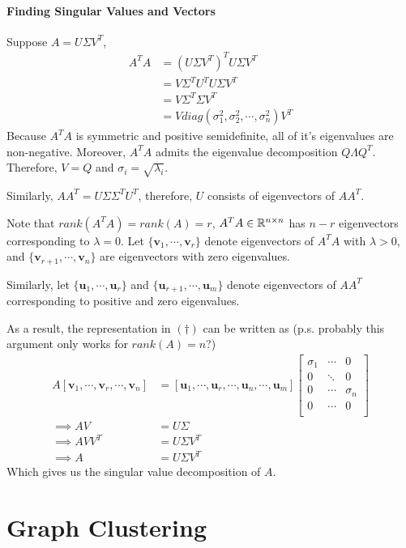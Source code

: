 \documentclass[11pt]{article}
\begin{document}
	\paragraph{Finding Singular Values and Vectors}
	Suppose $A = U \Sigma V^T$,
	\begin{align}
		A^T A &= (U \Sigma V^T)^T U \Sigma V^T \\
		&= V \Sigma^T U^T U \Sigma V^T \\
		&= V \Sigma^T \Sigma V^T \\
		&= V diag(\sigma_1^2, \sigma_2^2, \cdots, \sigma_n^2) V^T
	\end{align}
	Because $A^T A$ is symmetric and positive semidefinite, all of it's eigenvalues are non-negative. Moreover, $A^TA$ admits the eigenvalue decomposition $Q \Lambda Q^T$. Therefore, $V = Q$ and $\sigma_i = \sqrt{\lambda_i}$.
	
	Similarly, $A A^T = U \Sigma \Sigma^T U^T$, therefore, $U$ consists of eigenvectors of $A A^T$.
	
	Note that $rank(A^TA) = rank(A) = r$, $A^T A \in \mathbb{R}^{n \times n}$ has $n - r$ eigenvectors corresponding to $\lambda = 0$.
	Let $\{\mathbf{v}_1, \cdots, \mathbf{v}_r\}$ denote eigenvectors of $A^TA$ with $\lambda > 0$, and $\{\mathbf{v}_{r+1}, \cdots, \mathbf{v}_{n}\}$ are eigenvectors with zero eigenvalues.
	
	Similarly, let $\{\mathbf{u}_1, \cdots, \mathbf{u}_r\}$ and $\{\mathbf{u}_{r+1}, \cdots, \mathbf{u}_m\}$ denote eigenvectors of $AA^T$ corresponding to positive and zero eigenvalues.

	As a result, the representation in $(\dagger)$ can be written as (p.s. probably this argument only works for $rank(A) = n$?)
	\begin{align}
		A [\mathbf{v}_1, \cdots, \mathbf{v}_r, \cdots, \mathbf{v}_n] &= [\mathbf{u}_1, \cdots, \mathbf{u}_r, \cdots, \mathbf{u}_n, \cdots, \mathbf{u}_m] \begin{bmatrix}
			\sigma_1 & \cdots & 0 \\
			0 & \ddots & 0 \\
			0 & \cdots & \sigma_n \\
			0 & \cdots & 0 \\
		\end{bmatrix} \\
		\implies A V &= U \Sigma \\
		\implies A V V^T &= U \Sigma V^T \\
		\implies A &= U \Sigma V^T
	\end{align}
	Which gives us the singular value decomposition of $A$.
	\section{Graph Clustering}
\end{document}
